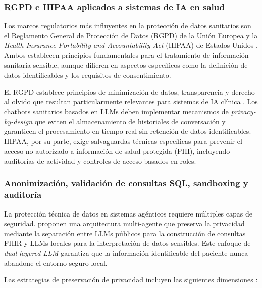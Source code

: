\subsubsection{RGPD e \ac{HIPAA} aplicados a sistemas de \ac{IA} en salud}

Los marcos regulatorios más influyentes en la protección de datos sanitarios son el Reglamento General de Protección de Datos (\ac{RGPD}) de la Unión Europea y la \textit{Health Insurance Portability and Accountability Act} (\ac{HIPAA}) de Estados Unidos \parencite{jonnagaddala2025privacy}. Ambos establecen principios fundamentales para el tratamiento de información sanitaria sensible, aunque difieren en aspectos específicos como la definición de datos identificables y los requisitos de consentimiento.

El \ac{RGPD} establece principios de minimización de datos, transparencia y derecho al olvido que resultan particularmente relevantes para sistemas de \ac{IA} clínica \parencite{arun2025ethical}. Los chatbots sanitarios basados en \ac{LLM}s deben implementar mecanismos de \textit{privacy-by-design} que eviten el almacenamiento de historiales de conversación y garanticen el procesamiento en tiempo real sin retención de datos identificables. \ac{HIPAA}, por su parte, exige salvaguardas técnicas específicas para prevenir el acceso no autorizado a información de salud protegida (PHI), incluyendo auditorías de actividad y controles de acceso basados en roles.

\subsubsection{Anonimización, validación de consultas \ac{SQL}, sandboxing y auditoría}

La protección técnica de datos en sistemas agénticos requiere múltiples capas de seguridad. \textcite{demaio2024multiagent} proponen una arquitectura multi-agente que preserva la privacidad mediante la separación entre \ac{LLM}s públicos para la construcción de consultas \ac{FHIR} y \ac{LLM}s locales para la interpretación de datos sensibles. Este enfoque de \textit{dual-layered LLM} garantiza que la información identificable del paciente nunca abandone el entorno seguro local.

Las estrategias de preservación de privacidad incluyen las siguientes dimensiones \parencite{jonnagaddala2025privacy}:

